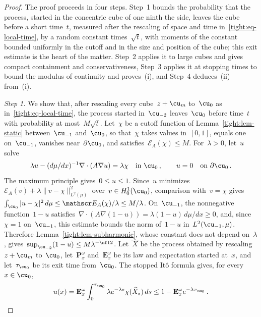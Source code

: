 \documentclass[11pt]{amsart}
\begin{document}
\begin{proof}
The proof proceeds in four steps. Step~1 bounds the probability that the process, started in the concentric cube of one ninth the side, leaves the cube before a short time~$t$, measured after the rescaling of space and time in~\eqref{tight:eq-local-time}, by a random constant times~$\sqrt t$, with moments of the constant bounded uniformly in the cutoff and in the size and position of the cube; this exit estimate is the heart of the matter. Step~2 applies it to large cubes and gives compact containment and conservativeness, Step~3 applies it at stopping times to bound the modulus of continuity and proves~(i), and Step~4 deduces~(ii) from~(i).

\smallskip

\emph{Step 1.} We show that, after rescaling every cube~$z+\cu_m$ to~$\cu_0$ as in~\eqref{tight:eq-local-time}, the process started in~$\cu_{-2}$ leaves~$\cu_0$ before time~$t$ with probability at most~$M\sqrt t$. Let~$\chi$ be a cutoff function of Lemma~\ref{tight:lem-static} between~$\cu_{-1}$ and~$\cu_0$, so that~$\chi$ takes values in~$[0,1]$, equals one on~$\cu_{-1}$, vanishes near~$\partial\cu_0$, and satisfies~$\mathscr E_A(\chi)\leq M$. For~$\lambda>0$, let~$u$ solve
\begin{equation*}
	\lambda u-(d\mu/dx)^{-1}\nabla\cdot(A\nabla u)=\lambda\chi\quad\text{in }\cu_0\,,
	\qquad u=0\quad\text{on }\partial\cu_0\,.
\end{equation*}
The maximum principle gives~$0\leq u\leq1$. Since~$u$ minimizes~$\mathscr E_A(v)+\lambda\|v-\chi\|_{L^2(\mu)}^2$ over~$v\in H^1_0(\cu_0)$, comparison with~$v=\chi$ gives~$\int_{\cu_0}|u-\chi|^2\,d\mu\leq\mathscr E_A(\chi)/\lambda\leq M/\lambda$. On~$\cu_{-1}$, the nonnegative function~$1-u$ satisfies~$\nabla\cdot(A\nabla(1-u))=\lambda(1-u)\,d\mu/dx\geq0$, and, since~$\chi=1$ on~$\cu_{-1}$, this estimate bounds the norm of~$1-u$ in~$L^2(\cu_{-1},\mu)$. Therefore Lemma~\ref{tight:lem-subharmonic}, whose constant does not depend on~$\lambda$, gives~$\sup_{\cu_{-2}}(1-u)\leq M\lambda^{-\nf12}$. Let~$\widehat X$ be the process obtained by rescaling~$z+\cu_m$ to~$\cu_0$, let~$\mathbf P_x^\omega$ and~$\mathbf E_x^\omega$ be its law and expectation started at~$x$, and let~$\tau_{\cu_0}$ be its exit time from~$\cu_0$. The stopped It\^o formula gives, for every~$x\in\cu_0$,
\begin{equation*}
	u(x)=\mathbf E_x^\omega\int_0^{\tau_{\cu_0}}
	\lambda e^{-\lambda s}\chi(\widehat X_s)\,ds
	\leq1-\mathbf E_x^\omega e^{-\lambda\tau_{\cu_0}}\,.
\end{equation*}

\end{proof}
\end{document}
